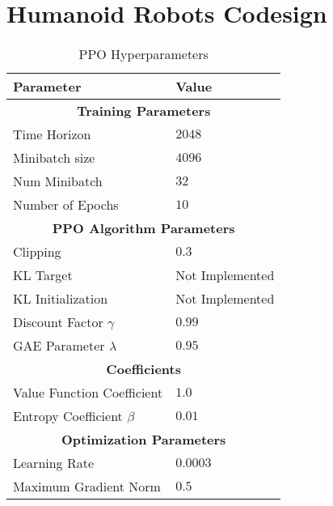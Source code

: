 \chapter{Humanoid Robots Codesign}

\begin{table}[h]
\centering
\begin{tabular}{ll}
\toprule
\textbf{Parameter} & \textbf{Value} \\
\midrule
\multicolumn{2}{c}{\textbf{Training Parameters}} \\
Time Horizon & $2048$ \\
Minibatch size & $4096$ \\
Num Minibatch & $32$ \\
Number of Epochs & $10$ \\
\midrule
\multicolumn{2}{c}{\textbf{PPO Algorithm Parameters}} \\
Clipping & $0.3$ \\
KL Target & Not Implemented \\
KL Initialization & Not Implemented \\
Discount Factor $\gamma$ & $0.99$ \\
GAE Parameter $\lambda$ & $0.95$ \\
\midrule
\multicolumn{2}{c}{\textbf{Coefficients}} \\
Value Function Coefficient & $1.0$ \\
Entropy Coefficient $\beta$ & $0.01$ \\
\midrule
\multicolumn{2}{c}{\textbf{Optimization Parameters}} \\
Learning Rate & $0.0003$ \\
Maximum Gradient Norm & $0.5$ \\
\bottomrule
\end{tabular}
\caption{PPO Hyperparameters}
\end{table}